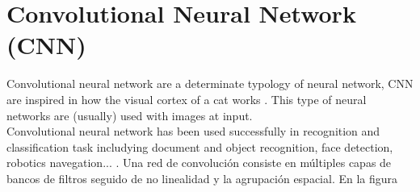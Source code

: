 \section{Convolutional Neural Network (CNN)}
Convolutional neural network are a determinate typology of neural network, CNN are inspired in how the visual cortex of a cat works \cite{Doorn}. This type of neural networks are (usually) used with images at input.\\

Convolutional neural network has been used successfully in recognition and classification task includying document and object recognition, face detection, robotics navegation... \cite{Lecum2, Lecum3}.
 Una red de convolución consiste en múltiples capas de bancos de filtros seguido de no linealidad y la agrupación espacial. En la figura %
